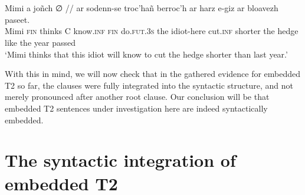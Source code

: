 \documentclass[output=paper,colorlinks,citecolor=brown]{langscibook}
\begin{document}
\ea \label{ex:jouitteau:26} \\
    \z
    \z 


\ea \label{ex:jouitteau:27} \\
    \gll *Mimi  a     joñch  ∅  //  {}     {}        ar  sodenn-se  troc’hañ berroc'h  ar  harz      e-giz ar   bloavezh paseet. \\
     Mimi \textsc{fin} thinks C     know.\textsc{inf} \textsc{fin} do\textsc{.fut.3s}   the idiot-here  cut.\textsc{inf} shorter    the hedge like the year passed \\
    \glt ‘Mimi thinks that this idiot will know to cut the hedge shorter than last year.’ \\
    \z 

\noindent With this in mind, we will now check that in the gathered evidence for embedded T2 so far, the clauses were fully integrated into the syntactic structure, and not merely pronounced after another root clause. Our conclusion will be that embedded T2 sentences under investigation here are indeed syntactically embedded. 

\section{The syntactic integration of embedded T2}\label{sec:jouitteau:4}
\end{document}

